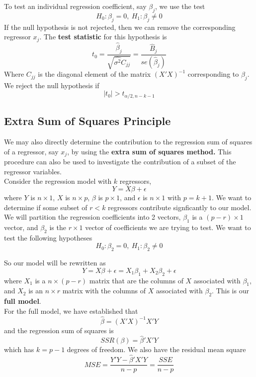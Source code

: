 To test an individual regression coefficient, say $\beta_j$, we use the test 
\[H_0: \beta_j = 0, \ H_1: \beta_j \neq 0\]
If the null hypothesis is not rejected, then we can remove the corresponding regressor $x_j$. The \textbf{test statistic} for this hypothesis is 
\[t_0 = \frac{\hat{\beta}_j}{\sqrt{\hat{\sigma^2}C_{jj}}} = \frac{\hat{B}_j}{se(\hat{\beta}_j)}\]
Where $C_{jj}$ is the diagonal element of the matrix $(X'X)^{-1}$ corresponding to $\beta_j$. We reject the null hypothesis if
\[|t_0| > t_{\alpha/2, n-k-1}\]
\subsection{Extra Sum of Squares Principle}

We may also directly determine the contribution to the regression sum of squares of a regressor, say $x_j$, by using the \textbf{extra sum of squares method.} This procedure can also be used to investigate the contribution of a subset of the regressor variables. \\

Consider the regression model with $k$ regressors, 
\[Y = X\beta + \epsilon\]
where $Y$ is $n\times 1$, $X$ is $n\times p$, $\beta$ is $p\times 1$, and $\epsilon$ is $n \times 1$ with $p = k+1$. We want to determine if some subset of $r < k$ regressors contribute signficantly to our model. We will partition the regression coefficients into 2 vectors, $\beta_1$ is a $(p-r) \times 1$ vector, and $\beta_2$ is the $r \times 1$ vector of coefficients we are trying to test. We want to test the following hypotheses
\[H_0: \beta_2 = 0, \ H_1: \beta_2 \neq 0\]

So our model will be rewritten as
\[Y = X\beta + \epsilon = X_1\beta_1 + X_2\beta_2 + \epsilon\]
where $X_1$ is a $n \times (p-r)$ matrix that are the columns of $X$ associated with $\beta_1$, and $X_2$ is an $n \times r$ matrix with the columns of $X$ associated with $\beta_2$. This is our \textbf{full model}.\\

For the full model, we have established that 
\[\hat{\beta} = (X'X)^{-1}X'Y\]
and the regression sum of squares is 
\[SSR(\beta) = \hat{\beta}'X'Y\]
which has $k = p-1$ degrees of freedom. We also have the residual mean square 
\[MSE = \frac{Y'Y - \hat{\beta}'X'Y}{n-p} = \frac{SSE}{n-p}\]

